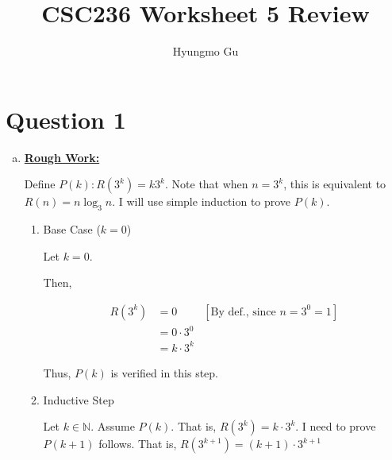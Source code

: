 \documentclass[12pt]{article}
\begin{document}
\title{CSC236 Worksheet 5 Review}
\author{Hyungmo Gu}
\maketitle

\section*{Question 1}
\begin{enumerate}[a.]
    \item

    \begin{mdframed}
        \underline{\textbf{Rough Work:}}

        \bigskip

        Define $P(k): R(3^k) = k3^k$. Note that when $n = 3^k$, this is equivalent
        to $R(n) = n\log_3 n$. I will use simple induction to prove $P(k)$.

        \bigskip

        \begin{enumerate}[1.]
            \item Base Case ($k = 0$)

            \begin{mdframed}
            Let $k = 0$.

            \bigskip

            Then,

            \begin{align}
                R(3^k) &= 0 & [\text{By def., since $n = 3^0 = 1$}]\\
                &= 0 \cdot 3^0\\
                &= k \cdot 3^k
            \end{align}

            \bigskip

            Thus, $P(k)$ is verified in this step.

            \end{mdframed}

            \item Inductive Step

            \begin{mdframed}
            Let $k \in \mathbb{N}$. Assume $P(k)$. That is, $R(3^k) = k \cdot 3^k$.
            I need to prove $P(k+1)$ follows. That is, $R(3^{k+1}) = (k+1) \cdot 3^{k+1}$

            \bigskip


\end{mdframed}
\end{enumerate}
\end{mdframed}
\end{enumerate}
\end{document}
